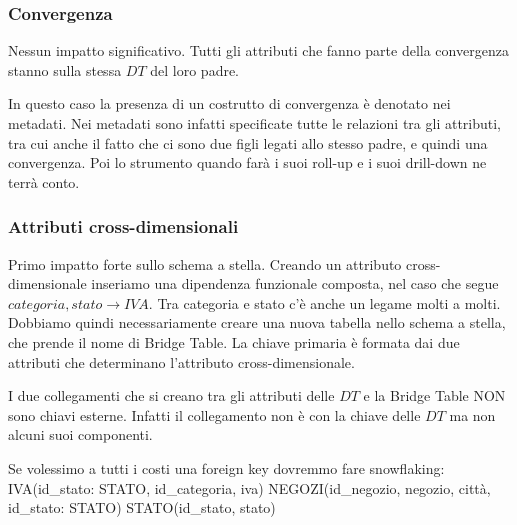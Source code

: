 \subsubsection{Convergenza}
Nessun impatto significativo. Tutti gli attributi che fanno parte della convergenza stanno sulla stessa $DT$ del loro padre.
\begin{info}
	In questo caso la presenza di un costrutto di convergenza è denotato nei metadati. Nei metadati sono infatti specificate tutte le relazioni tra gli attributi, tra cui anche il fatto che ci sono due figli legati allo stesso padre, e quindi una convergenza. Poi lo strumento quando farà i suoi roll-up e i suoi drill-down ne terrà conto.
\end{info}
\subsubsection{Attributi cross-dimensionali}
Primo impatto forte sullo schema a stella. Creando un attributo cross-dimensionale inseriamo una dipendenza funzionale composta, nel caso che segue $ categoria, stato \xrightarrow{} IVA$.
Tra categoria e stato c'è anche un legame molti a molti. Dobbiamo quindi necessariamente creare una nuova tabella nello schema a stella, che prende il nome di Bridge Table. La chiave primaria è formata dai due attributi che determinano l'attributo cross-dimensionale.
\begin{warn}
	I due collegamenti che si creano tra gli attributi delle $DT$ e la Bridge Table NON sono chiavi esterne. Infatti il collegamento non è con la chiave delle $DT$ ma non alcuni suoi componenti.
\end{warn}
Se volessimo a tutti i costi una foreign key dovremmo fare snowflaking:\newline\newline
IVA(id\_stato: STATO, id\_categoria, iva)\newline
NEGOZI(id\_negozio, negozio, città, id\_stato: STATO)\newline
STATO(id\_stato, stato)\newline
